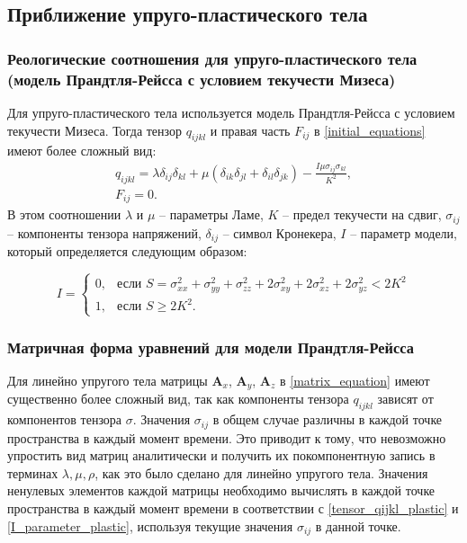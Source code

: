 
\clearpage
\newpage

\subsection{Приближение упруго-пластического тела}

\subsubsection{Реологические соотношения для упруго-пластического тела (модель Прандтля-Рейсса с условием текучести Мизеса)}

Для упруго-пластического тела используется модель Прандтля-Рейсса с условием текучести Мизеса. Тогда тензор $q_{ijkl}$ и правая часть $F_{ij}$ в \ref{initial_equations} имеют более сложный вид:
\begin{eqnarray}
\label{tensor_qijkl_plastic}
q_{ijkl}=\lambda\delta_{ij}\delta_{kl}+\mu(\delta_{ik}\delta_{jl}+\delta_{il}\delta_{jk})-\frac{I\mu\sigma_{ij}\sigma_{kl}}{K^2},
\nonumber\\
F_{ij}=0.
\end{eqnarray}
В этом соотношении $\lambda$ и $\mu$ -- параметры Ламе, $K$ -- предел текучести на сдвиг, $\sigma_{ij}$ -- компоненты тензора напряжений, $\delta_{ij}$ -- символ Кронекера, $I$ -- параметр модели, который определяется следующим образом:

\begin{equation}
\label{I_parameter_plastic}
I=\begin{cases}
0, & \text{если $S = \sigma_{xx}^2+\sigma_{yy}^2+\sigma_{zz}^2+2\sigma_{xy}^2+2\sigma_{xz}^2+2\sigma_{yz}^2 < 2K^2$}\\
1, & \text{если $S \ge 2K^2$}.
\end{cases}
\end{equation}

\subsubsection{Матричная форма уравнений для модели Прандтля-Рейсса}
\label{plastic_matrixes}

Для линейно упругого тела матрицы $\mathbf{A}_x$, $\mathbf{A}_y$, $\mathbf{A}_z$ в \ref{matrix_equation} имеют существенно более сложный вид, так как компоненты тензора $q_{ijkl}$ зависят от компонентов тензора $\sigma$. Значения $\sigma_{ij}$ в общем случае различны в каждой точке пространства в каждый момент времени. Это приводит к тому, что невозможно упростить вид матриц аналитически и получить их покомпонентную запись в терминах $\lambda, \mu, \rho$, как это было сделано для линейно упругого тела. Значения ненулевых элементов каждой матрицы необходимо вычислять в каждой точке пространства в каждый момент времени в соответствии с \ref{tensor_qijkl_plastic} и \ref{I_parameter_plastic}, используя текущие значения $\sigma_{ij}$ в данной точке.


